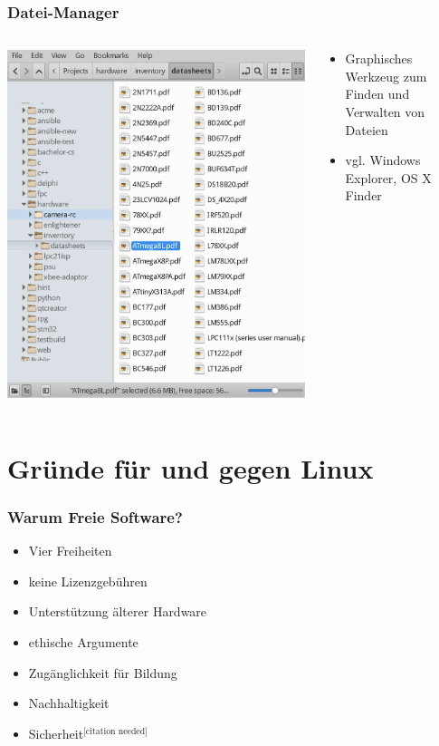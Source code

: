 \documentclass[t]{beamer}
\begin{document}
\begin{frame}
  \frametitle{Datei-Manager}
  \begin{columns}
    \begin{column}[T]{0.45\textwidth}
      \includegraphics[width=\textwidth]{img-src/file-manager.png}
    \end{column}
    \begin{column}{0.45\textwidth}
      \begin{itemize}
      \item Graphisches Werkzeug zum Finden und Verwalten von Dateien
      \item vgl. Windows Explorer, OS X Finder
      \end{itemize}
    \end{column}
  \end{columns}
\end{frame}

\section{Gründe für und gegen Linux}
\begin{frame}
  \frametitle{Warum Freie Software?}
  \begin{itemize}
  \item Vier Freiheiten
  \item keine Lizenzgebühren
  \item Unterstützung älterer Hardware
  \item ethische Argumente
  \item Zugänglichkeit für Bildung
  \item Nachhaltigkeit
  \item Sicherheit${}^\text{[citation needed]}$
  \end{itemize}
\end{frame}
\end{document}
